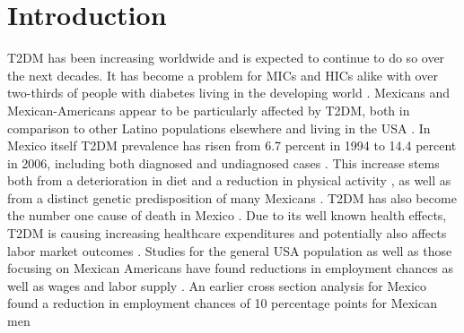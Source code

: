 \documentclass[12pt,english,british]{article}
\begin{document}
\section{\label{sec:Introduction}Introduction }

\ac{T2DM} has been increasing worldwide and is expected to continue to do so over the next decades. It has become a problem for \ac{MICs} and \ac{HICs} alike with over two-thirds of people with diabetes living in the developing world \citep{InternationalDiabetesFederation2013}. Mexicans and Mexican-Americans appear to be particularly affected by \ac{T2DM}, both in comparison to other Latino populations elsewhere  and living in the \ac{USA} \citep{Schneiderman2014}. In Mexico itself \ac{T2DM} prevalence has risen from 6.7 percent in 1994 to 14.4 percent in 2006, including both diagnosed and undiagnosed cases \citep{Barquera2013}. This increase stems  both from a deterioration in diet and a reduction in physical activity \citep{Barquera2008b,Basu2013}, as well as from a distinct genetic predisposition of many Mexicans \citep{Williams2013}. \ac{T2DM} has also become the number one cause of death in Mexico \citep{23374611}. Due to its well known health effects, \ac{T2DM} is causing increasing healthcare expenditures and potentially also affects labor market outcomes \citep{Seuring2015a}. Studies for the general \ac{USA} population as well as those focusing on Mexican Americans have found reductions in employment chances as well as wages and labor supply \citep{Brown2005,Brown2014,BrownIII2011,Minor2010,Minor2013}. An earlier cross section analysis for Mexico found a reduction in employment chances of 10 percentage points for Mexican men \citep{Seuring2015} 
\end{document}
